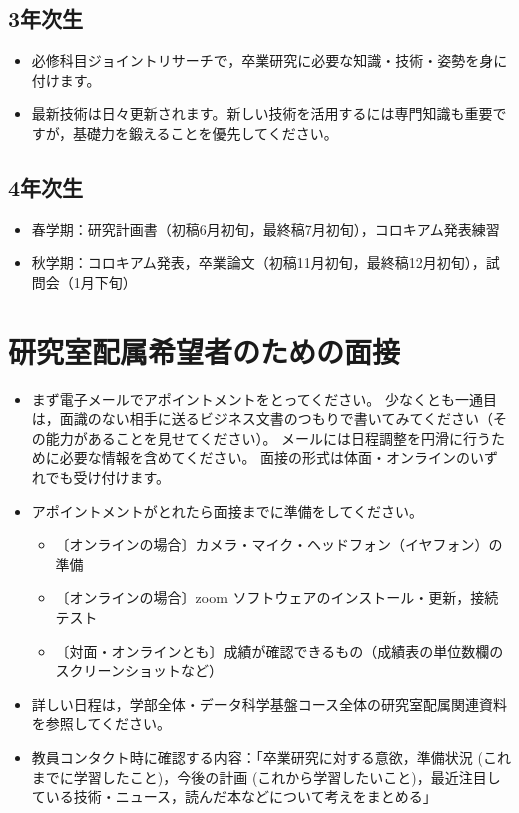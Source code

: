 \documentclass[uplatex,jis2004,a4paper,11pt]{jsarticle}
\begin{document}
\subsection*{3年次生}
\vspace{-.3cm}
\begin{itemize}
  \item 必修科目ジョイントリサーチで，卒業研究に必要な知識・技術・姿勢を身に付けます。
  \item 最新技術は日々更新されます。新しい技術を活用するには専門知識も重要ですが，基礎力を鍛えることを優先してください。
\end{itemize}
\vspace{-.6cm}
\subsection*{4年次生}
\vspace{-.3cm}
\begin{itemize}
  \item 春学期：研究計画書（初稿6月初旬，最終稿7月初旬），コロキアム発表練習
  \item 秋学期：コロキアム発表，卒業論文（初稿11月初旬，最終稿12月初旬），試問会（1月下旬）
\end{itemize}

\section{研究室配属希望者のための面接}

\begin{itemize}
  \item まず電子メールでアポイントメントをとってください。
    少なくとも一通目は，面識のない相手に送るビジネス文書のつもりで書いてみてください（その能力があることを見せてください）。
    メールには日程調整を円滑に行うために必要な情報を含めてください。
    面接の形式は体面・オンラインのいずれでも受け付けます。
  \item アポイントメントがとれたら面接までに準備をしてください。
    \begin{itemize}
      \item 〔オンラインの場合〕カメラ・マイク・ヘッドフォン（イヤフォン）の準備
      \item 〔オンラインの場合〕zoom ソフトウェアのインストール・更新，接続テスト
      \item 〔対面・オンラインとも〕成績が確認できるもの（成績表の単位数欄のスクリーンショットなど）
    \end{itemize}
  \item 詳しい日程は，学部全体・データ科学基盤コース全体の研究室配属関連資料を参照してください。
  \item 教員コンタクト時に確認する内容：「卒業研究に対する意欲，準備状況 (これまでに学習したこと)，今後の計画 (これから学習したいこと)，最近注目している技術・ニュース，読んだ本などについて考えをまとめる」
\end{itemize}
\end{document}
